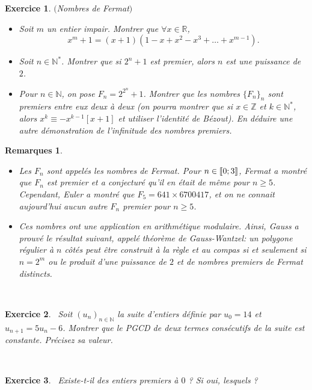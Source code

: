 \documentclass[11pt,a4paper]{article}
\newtheorem{ex}{Exercice}
\newtheorem*{rem2}{Remarques}
\newcommand{\N}{\mathbb{N}}
\newcommand{\Z}{\mathbb{Z}}
\begin{document}
\


\

\begin{ex}\label{exNombres_Fermat}$($Nombres de Fermat$)$
\begin{itemize}
\item[$1.$] Soit $m$ un entier impair. Montrer que $\forall x \in \mathbb{R}$, 
$$ x^m+1=(x+1)(1-x+x^2-x^3+\ldots + x^{m-1}).$$
\item[$2.$] Soit $n \in \mathbb{N}^*$. Montrer que si $2^n+1$ est premier, alors $n$ est une puissance de $2$.%
\item[$3.$] Pour $n \in \mathbb{N}$, on pose $F_n=2^{2^{n}}+1$. Montrer que les nombres $\{ F_n \}_n$ sont premiers entre eux deux à deux (on pourra montrer que si $x\in \Z$ et $k\in \N^*$, alors $x^k\equiv -x^{k-1} [x+1]$ et utiliser l'identité de Bézout). En déduire une autre  démonstration de l'infinitude des nombres premiers. 
\end{itemize}
\end{ex}

\begin{rem2}\
\begin{itemize}
\item[•]Les $F_n$ sont appelés les nombres de Fermat. Pour $n \in \llbracket 0;3 \rrbracket $, Fermat a montré que $F_n$ est premier et a conjecturé qu'il en était de même pour $n \geqslant 5$. Cependant, Euler a montré que $F_5=641 \times 6700417$, et on ne connait aujourd'hui aucun autre $F_n$ premier pour $n \geqslant 5$.
\item[•]Ces nombres ont une application en arithmétique modulaire. Ainsi, Gauss a prouvé le résultat suivant, appelé théorème de Gauss-Wantzel: un polygone régulier à $n$ côtés peut être construit à la règle et au compas si et seulement si $n=2^m$ ou le produit d'une puissance de $2$ et de nombres premiers de Fermat distincts. 
\end{itemize} 
\end{rem2}


\


\begin{ex}\label{exPGCD_suite}\
Soit $(u_n)_{n \in \mathbb{N}}$ la suite d'entiers définie par $u_0=14$ et $u_{n+1}=5 u_n -6$. Montrer que le PGCD de deux termes consécutifs de la suite est constante. Précisez sa valeur.
\end{ex}



\
\begin{ex}\
Existe-t-il des entiers premiers à $0$ ? Si oui, lesquels ?
\end{ex}
\end{document}
